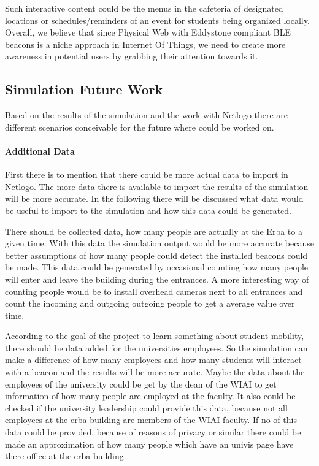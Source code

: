 \par Such interactive content could be the menus in the cafeteria of designated locations or schedules/reminders of an event for students being organized locally. Overall, we believe that since Physical Web with Eddystone compliant BLE beacons is a niche approach in Internet Of Things, we need to create more awareness in potential users by grabbing their attention towards it.

\subsection{Simulation Future Work}

Based on the results of the simulation and the work with Netlogo there are different scenarios conceivable for the future where could be worked on. 

\paragraph{Additional Data}

First there is to mention that there could be more actual data to import in Netlogo. The more data there is available to import the results of the simulation will be more accurate. In the following there will be discussed what data would be useful to import to the simulation and how this data could be generated.

\par There should be collected data, how many people are actually at the Erba to a given time. With this data the simulation output would be more accurate because better assumptions of how many people could detect the installed beacons could be made. This data could be generated by occasional counting how many people will enter and leave the building during the entrances. A more interesting way of counting people would be to install overhead cameras next to all entrances and count the incoming and outgoing outgoing people to get a average value over time.

\par According to the goal of the project to learn something about student mobility, there should be data added for the universities employees. So the simulation can make a difference of how many employees and how many students will interact with a beacon and the results will be more accurate. Maybe the data about the employees of the university could be get by the dean of the WIAI to get information of how many people are employed at the faculty. It also could be checked if the university leadership could provide this data, because not all employees at the erba building are members of the WIAI faculty. If no of this data could be provided, because of reasons of privacy or similar there could be made an approximation of how many people which have an univis page have there office at the erba building.


